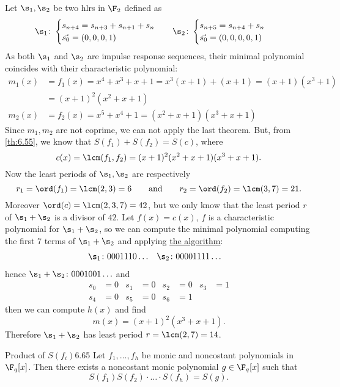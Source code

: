 \begin{ese}
	Let \(\s_1,\s_2\) be two hlrs in \(\F_2\) defined as
	\begin{align*}
		\s_1 & \colon
		\begin{cases}
			s_{n+4}=s_{n+3}+s_{n+1}+s_n \\
			\vec{s_0}=(0,0,0,1)
		\end{cases}
		     & 
		\s_2 & \colon
		\begin{cases}
			s_{n+5}=s_{n+4}+s_n \\
			\vec{s_0}=(0,0,0,0,1)
		\end{cases}
	\end{align*}
	As both \(\s_1\) and \(\s_2\) are impulse response sequences, their minimal polynomial coincides with their characteristic polynomial:
	\begin{align*}
		m_1(x) & = f_1(x) = x^4+x^3+x+1 = x^3(x+1) + (x+1) = (x+1)(x^3+1) \\
		       & = (x+1)^2(x^2+x+1)                                       \\
		m_2(x) & = f_2(x) = x^5+x^4+1 = (x^2+x+1)(x^3+x+1)
	\end{align*}
	Since \(m_1,m_2\) are not coprime, we can not apply the last theorem. But, from \autoref{th:6.55}, we know that \(S(f_1)+S(f_2)=S(c)\), where
	\[
		c(x) = \lcm(f_1,f_2) = (x+1)^2(x^2+x+1)(x^3+x+1).
	\]
	Now the least periods of \(\s_1,\s_2\) are respectively
	\[
		r_1 = \ord(f_1) = \lcm(2,3) = 6 \qquad\text{and}\qquad r_2 = \ord(f_2) = \lcm(3,7) = 21.
	\]
	Moreover \(\ord(c)=\lcm(2,3,7)=42\), but we only know that the least period \(r\) of \(\s_1+\s_2\) is a divisor of \(42\).
	Let \(f(x)=c(x)\), \(f\) is a characteristic polynomial for \(\s_1+\s_2\), so we can compute the minimal polynomial computing the first \(7\) terms of \(\s_1+\s_2\) and applying \hyperref[minAlg]{the algorithm}:
	\begin{align*}
		\s_1 & \colon 0001110 \ldots & \s_2 & \colon 00001111 \ldots
	\end{align*}
	hence \(\s_1+\s_2\colon 0001001 \ldots\) and
	\begin{align*}
		s_0 & = 0 & s_1 & = 0 & s_2 & = 0  & s_3 & = 1 \\
		s_4 & = 0 & s_5 & = 0 & s_6 & = 1
	\end{align*}
	then we can compute \(h(x)\) and find 
	\[
		m(x) = (x+1)^2(x^3+x+1).
	\]
	Therefore \(\s_1+\s_2\) has least period \(r=\lcm(2,7)=14\). 
\end{ese}
%
%
\begin{teor}{Product of \(S(f_i)\)}{6.65}
	Let \(f_1,\ldots,f_h\) be monic and noncostant polynomials in \(\F_q[x]\). Then there exists a noncostant monic polynomial \(g\in\F_q[x]\) such that
	\[
		S(f_1)S(f_2) \cdot\ldots\cdot S(f_h) = S(g).
	\]
\end{teor}

